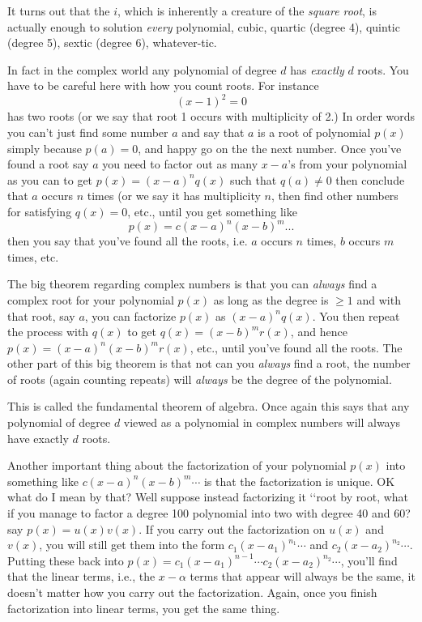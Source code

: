 

It turns out that the $i$, which is inherently a creature of the 
\textit{square root},
is actually enough to solution \textit{every} polynomial,
cubic, quartic (degree 4), quintic (degree 5), sextic (degree 6), 
whatever-tic.

In fact in the complex world any polynomial of degree $d$ has \textit{exactly} $d$
roots. 
You have to be careful here with how you count roots.
For instance
\[
(x - 1)^2 = 0
\]
has two roots (or we say that root 1 occurs with multiplicity of 2.)
In order words you  can't just find some number $a$ and say that 
$a$ is a root of polynomial $p(x)$ simply because $p(a) = 0$, and happy
go on the the next number. Once you've found a root say $a$
you need to factor out as many $x-a$'s from 
your polynomial as you can to get $p(x) = (x-a)^n q(x)$
such that $q(a) \neq 0$ 
then conclude that $a$ occurs $n$ times (or we say it has multiplicity $n$,
then find other numbers for satisfying $q(x) = 0$, etc., until you get
something like
\[
p(x) = c(x-a)^n (x-b)^m ...
\]
then you say that you've found all the roots, i.e. $a$ occurs $n$ times, $b$ occurs
$m$ times, etc. 

The big theorem regarding complex numbers is that you can \textit{always} find a complex
root for your polynomial $p(x)$ as long as the degree is $\geq 1$ and with that
root, say $a$, you can factorize $p(x)$ as $(x-a)^nq(x)$.
You then repeat the process with $q(x)$ to get $q(x) = (x-b)^m r(x)$, and hence
$p(x) = (x-a)^n(x-b)^m r(x)$, etc., until you've found all the roots.
The other part of this big theorem is that not can you \textit{always} find a root,
the number of roots (again counting repeats) will \textit{always} be the degree
of the polynomial.

This is called the fundamental theorem of algebra.
Once again this says that any polynomial of degree $d$ viewed as a polynomial in complex
numbers will always have exactly $d$ roots.

Another important thing about the factorization of your polynomial $p(x)$ into
something like $c(x-a)^n(x-b)^m \cdots$ is that the factorization is unique.
OK what do I mean by that?
Well suppose instead factorizing it \lq\lq root by root, what if you 
manage to factor a degree 100 polynomial into two with degree 40 and 60?
say $p(x) = u(x) v(x)$.
If you carry out the factorization on $u(x)$ and $v(x)$, you will
still get them into the form $c_1(x-a_1)^{n_1} \cdots$ and $c_2(x-a_2)^{n_2} \cdots$.
Putting these back into $p(x) = c_1(x-a_1)^{n-1} \cdots c_2(x-a_2)^{n_2} \cdots$,
you'll find that the linear terms, i.e., the $x-\alpha$ terms that appear will always
be the same, it doesn't matter how you carry out the factorization.
Again, once you finish factorization into linear terms, you get the same thing.

